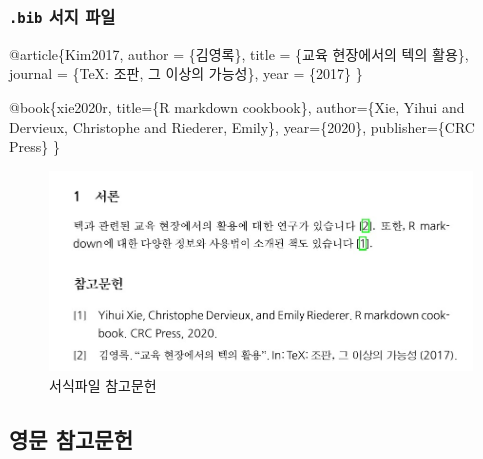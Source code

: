 \documentclass[
  letterpaper,
]{book}
\newenvironment{Shaded}{\begin{snugshade}}{\end{snugshade}}
\newcommand{\DataTypeTok}[1]{\textcolor[rgb]{0.68,0.00,0.00}{#1}}
\newcommand{\NormalTok}[1]{\textcolor[rgb]{0.00,0.23,0.31}{#1}}
\newcommand{\OtherTok}[1]{\textcolor[rgb]{0.00,0.23,0.31}{#1}}
\newcommand{\VariableTok}[1]{\textcolor[rgb]{0.07,0.07,0.07}{#1}}
\begin{document}
\hypertarget{bib-uxc11cuxc9c0-uxd30cuxc77c}{%
\subsubsection{\texorpdfstring{\texttt{.bib} 서지
파일}{.bib 서지 파일}}\label{bib-uxc11cuxc9c0-uxd30cuxc77c}}

\begin{Shaded}
\begin{Highlighting}[]
\VariableTok{@article}\NormalTok{\{}\OtherTok{Kim2017}\NormalTok{,  }
    \DataTypeTok{author}\NormalTok{ = \{김영록\},  }
    \DataTypeTok{title}\NormalTok{ = \{교육 현장에서의 텍의 활용\},  }
    \DataTypeTok{journal}\NormalTok{ = \{TeX: 조판, 그 이상의 가능성\},  }
    \DataTypeTok{year}\NormalTok{ = \{2017\}}
\NormalTok{\}}

\VariableTok{@book}\NormalTok{\{}\OtherTok{xie2020r}\NormalTok{,  }
    \DataTypeTok{title}\NormalTok{=\{R markdown cookbook\},  }
    \DataTypeTok{author}\NormalTok{=\{Xie, Yihui and Dervieux, Christophe and Riederer, Emily\},  }
    \DataTypeTok{year}\NormalTok{=\{2020\},  }
    \DataTypeTok{publisher}\NormalTok{=\{CRC Press\}}
\NormalTok{\}}
\end{Highlighting}
\end{Shaded}

\begin{figure}

{\centering \includegraphics[width=6.61458in,height=\textheight]{images/bibtex_reference.jpg}

}

\caption{서식파일 참고문헌}

\end{figure}

\hypertarget{uxc601uxbb38-uxcc38uxace0uxbb38uxd5cc}{%
\subsection{영문 참고문헌}\label{uxc601uxbb38-uxcc38uxace0uxbb38uxd5cc}}
\end{document}
